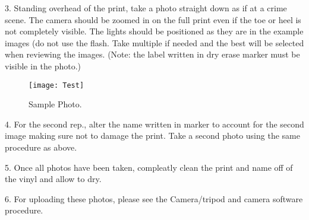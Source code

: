 3. Standing overhead of the print, take a photo straight down as if at a crime scene. The camera should be zoomed in on the full print even if the toe or heel is not completely visible. The lights should be positioned as they are in the example images (do not use the flash. Take multiple if needed and the best will be selected when reviewing the images. (Note: the label written in dry erase marker must be visible in the photo.) 

\begin{figure}[!htp]
\centering
\texttt{[image: Test]}
\caption{Sample Photo.}
\label{img:Test}
\end{figure}

4. For the second rep., alter the name written in marker to account for the second image making sure not to damage the print. Take a second photo using the same procedure as above. 

5. Once all photos have been taken, compleatly clean the print and name off of the vinyl and allow to dry. 


6. For uploading these photos, please see the Camera/tripod and camera software procedure. 





